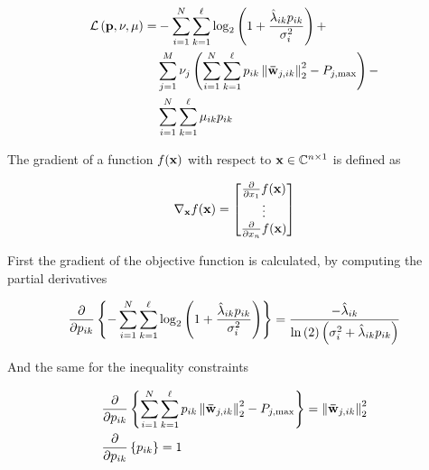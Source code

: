 \begin{equation} \label{eq:lagrangian}
\begin{aligned}
    \mathcal{L}\left(\mathbf{p}, \mathbf{\nu}, \mathbf{\mu}\right) =
    & -\sum\limits_{i = 1}^N
        \sum\limits_{k = 1}^\ell \log_2\left( 1 +
        \frac{\hat{\lambda}_{ik} p_{ik}}{\sigma_i^2} \right) + \\
    & \sum\limits_{j = 1}^M \nu_j\left(
        \sum\limits_{i = 1}^N \sum\limits_{k = 1}^\ell p_{ik} \left\|
        \mathbf{\bar{w}}_{j,ik} \right\|_2^2 - P_{j,\max}\right) - \\
    & \sum\limits_{i = 1}^N \sum\limits_{k = 1}^\ell \mu_{ik} p_{ik}
\end{aligned}
\end{equation}

The gradient of a function $f(\mathbf{x})$ with respect to $\mathbf{x} \in \mathbb{C}^{n \times 1}$ is
defined as

\begin{equation} \label{eq:gradient}
    \mathbf{\nabla}_{\mathbf{x}}f(\mathbf{x}) = \begin{bmatrix}
        \frac{\partial}{\partial x_1}f(\mathbf{x}) \\
        \vdots \\
        \frac{\partial}{\partial x_n}f(\mathbf{x})
    \end{bmatrix}
\end{equation}

First the gradient of the objective function is calculated, by computing the
partial derivatives

\begin{equation} \label{eq:gradient_objective}
    \frac{\partial}{\partial p_{ik}} \left\{
        -\sum\limits_{i = 1}^N
        \sum\limits_{k = 1}^\ell \log_2\left( 1 +
        \frac{\hat{\lambda}_{ik} p_{ik}}{\sigma_i^2} \right)
    \right\} = \frac{-\hat{\lambda}_{ik}}{\ln\left(2\right)\left(\sigma_i^2 +
    \hat{\lambda}_{ik} p_{ik}\right)}
\end{equation}

And the same for the inequality constraints

\begin{equation} \label{eq:gradient_constraints}
\begin{aligned}
    &\frac{\partial}{\partial p_{ik}} \left\{
    \sum\limits_{i = 1}^N \sum\limits_{k = 1}^\ell p_{ik}
    \left\| \wbar_{j,ik} \right\|_2^2 - P_{j,\max}
    \right\} = \left\| \wbar_{j,ik} \right\|_2^2 \\
%
    &\frac{\partial}{\partial p_{ik}} \left\{ p_{ik} \right\} = 1
\end{aligned}
\end{equation}

